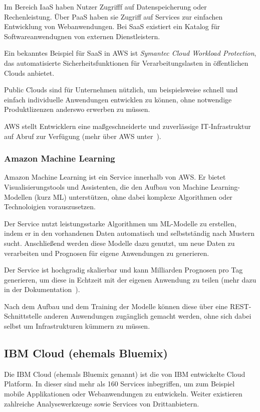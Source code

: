 Im Bereich IaaS haben Nutzer Zugrifff auf Datenspeicherung oder Rechenleistung. Über PaaS haben sie Zugriff auf
Services zur einfachen Entwicklung von Webanwendungen. Bei SaaS existiert ein Katalog für Softwareanwendugnen von
externen Dienstleistern.

Ein bekanntes Beispiel für SaaS in AWS ist \textit{Symantec Cloud Workload Protection}, das automatisierte
Sicherheitsfunktionen für Verarbeitungslasten in öffentlichen Clouds anbietet.

Public Clouds sind für Unternehmen nützlich, um beispielsweise schnell und einfach individuelle Anwendungen entwicklen
zu können, ohne notwendige Produktlizenzen anderswo erwerben zu müssen.

AWS stellt Entwicklern eine maßgeschneiderte und zuverlässige IT-Infrastruktur auf Abruf zur Verfügung
(mehr über AWS unter~\cite{online_grundlagen_aws}).

\subsubsection{Amazon Machine Learning}
Amazon Machine Learning ist ein Service innerhalb von AWS. Er bietet Visualisierungstools und Assistenten, die den Aufbau
von Machine Learning-Modellen (kurz ML) unterstützen, ohne dabei komplexe Algorithmen oder Technoloigien vorauszusetzen.

Der Service nutzt leistungsstarke Algorithmen um ML-Modelle zu erstellen, indem er in den vorhandenen Daten automatisch
und selbstständig nach Mustern sucht. Anschließend werden diese Modelle dazu genutzt, um neue Daten zu verarbeiten und
Prognosen für eigene Anwendungen zu generieren.

Der Service ist hochgradig skalierbar und kann Milliarden Prognosen pro Tag generieren, um diese in Echtzeit mit der
eigenen Anwendung zu teilen (mehr dazu in der Dokumentation~\cite{online_grundlagen_aws_learning}).

Nach dem Aufbau und dem Training der Modelle können diese über eine REST-Schnittstelle anderen Anwendungen zugänglich
gemacht werden, ohne sich dabei selbst um Infrastrukturen kümmern zu müssen.

\subsection{IBM Cloud (ehemals Bluemix)}
Die IBM Cloud (ehemals Bluemix genannt) ist die von IBM entwickelte Cloud Platform. In dieser sind mehr als 160 Services
inbegriffen, um zum Beispiel mobile Applikationen oder Webanwendungen zu entwickeln. Weiter existieren zahlreiche
Analysewerkzeuge sowie Services von Drittanbietern.

